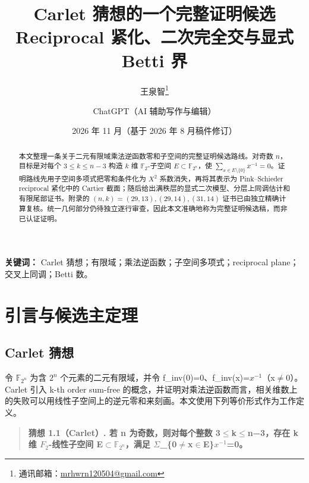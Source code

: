\documentclass[11pt]{ctexart}
\title{Carlet 猜想的一个完整证明候选\\[0.4em]\large Reciprocal 紧化、二次完全交与显式 Betti 界}
\author{王泉智\thanks{通讯邮箱：\href{mailto:mrhwrn120504@gmail.com}{mrhwrn120504@gmail.com}} \and ChatGPT（AI 辅助写作与编辑）}
\date{2026 年 11 月\quad（基于 2026 年 8 月稿件修订）}
\begin{document}
\maketitle
\begin{center}\end{center}
\begin{abstract}
本文整理一条关于二元有限域乘法逆函数零和子空间的完整证明候选路线。对奇数 $n$，目标是对每个 $3\le k\le n-3$ 构造 $k$ 维 $\mathbb F_2$-子空间 $E\subset\mathbb F_{2^n}$，使 $\sum_{x\in E\setminus\{0\}}x^{-1}=0$。证明路线先用子空间多项式把零和条件化为 $X^2$ 系数消失，再将其表示为 Pink--Schieder reciprocal 紧化中的 Cartier 截面；随后给出满秩层的显式二次模型、分层上同调估计和有限尾部证书。附录的 $(n,k)=(29,13),(29,14),(31,14)$ 证书已由独立精确计算复核。统一几何部分仍待独立逐行审查，因此本文准确地称为完整证明候选稿，而非已认证证明。
\end{abstract}
\noindent\textbf{关键词：} Carlet 猜想；有限域；乘法逆函数；子空间多项式；reciprocal plane；交叉上同调；Betti 数。\medskip
\tableofcontents\clearpage
\section{引言与候选主定理}

\subsection{Carlet 猜想}

令 \ensuremath{\mathbb F_{2^n}} 为含 \ensuremath{2^{n}} 个元素的二元有限域，并令 f\_inv(0)=0、f\_inv(x)=\ensuremath{x^{-1}}（x\ensuremath{\ne}0）。Carlet 引入 k-th order sum-free 的概念，并证明对乘法逆函数而言，相关维数上的失败可以用线性子空间上的逆元零和来刻画。本文使用下列等价形式作为工作定义。

\begin{quote}\textbf{猜想 1.1（Carlet）. 若 n 为奇数，则对每个整数 3\ensuremath{\le}k\ensuremath{\le}n−3，存在 k 维 \ensuremath{F_2}-线性子空间 E\ensuremath{\subset}\ensuremath{\mathbb F_{2^n}}，满足 \ensuremath{\Sigma}\_\{0\ensuremath{\ne}x\ensuremath{\in}E\}\ensuremath{x^{-1}}=0。}\end{quote}
\end{document}
